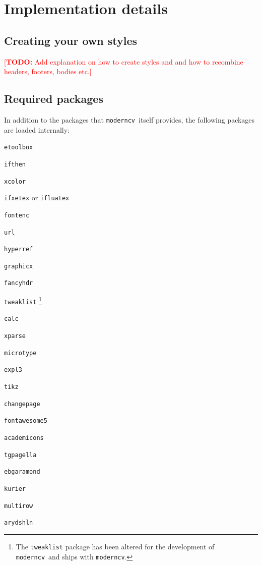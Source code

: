 \documentclass[a4paper, 11pt]{article}
\newcommand{\todox}[1]{\textcolor{red}{[\textbf{TODO:} #1]}}
\newcommand{\code}[1]{\lstinline!#1!}
\newcommand{\moderncv}{\code{moderncv}}
\newcommand{\Moderncv}{\moderncv~}
\begin{document}
\section{Implementation details}
\label{section:implementationDetails}

\subsection{Creating your own styles}
\todox{Add explanation on how to create styles and and how to recombine headers, footers, bodies etc.}

\subsection{Required packages}
\label{section:implementationDetails:requiredPackages}
In addition to the packages that \Moderncv itself provides, the following packages are loaded internally:
\begin{itemize}
  \begin{multicols}{2}
    \item \code{etoolbox}
    \item \code{ifthen}
    \item \code{xcolor}
    \item \code{ifxetex} or \code{ifluatex}
    \item \code{fontenc}
    \item \code{url}
    \item \code{hyperref}
    \item \code{graphicx}
    \item \code{fancyhdr}
    \item \code{tweaklist}%
    \footnote{The \code{tweaklist} package has been altered for the development of \Moderncv and ships with \moderncv.}
    \item \code{calc}
    \item \code{xparse}
    \item \code{microtype}
    \item \code{expl3}
    \item \code{tikz}
    \item \code{changepage}
    \item \code{fontawesome5}
    \item \code{academicons}
    \item \code{tgpagella}
    \item \code{ebgaramond}
    \item \code{kurier}
    \item \code{multirow}
    \item \code{arydshln}
  \end{multicols}
\end{itemize}
\end{document}
